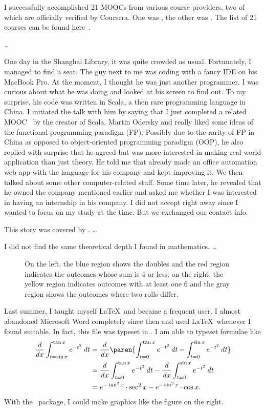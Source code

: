 	I successfully accomplished 21 MOOCs from various course providers, two of which are officially verified by Coursera. One was , the other was . The list of 21 courses can be found here~\cite{accredible}.
	
	\dots
	
	One day in the Shanghai Library, it was quite crowded as usual. Fortunately, I managed to find a seat. The guy next to me was coding with a fancy IDE on his MacBook Pro. At the moment, I thought he was just another programmer. I was curious about what he was doing and looked at his screen to find out. To my surprise, his code was written in Scala, a then rare programming language in China. I initiated the talk with him by saying that I just completed a related MOOC~\cite{FPPS} by the creator of Scala, Martin Odersky and really liked some ideas of the functional programming paradigm (FP). Possibly due to the rarity of FP in China as opposed to object-oriented programming paradigm (OOP), he also replied with surprise that he agreed but was more interested in making real-world application than just theory. He told me that already made an office automation web app with the language for his company and kept improving it. We then talked about some other computer-related stuff. Some time later, he revealed that he owned the company mentioned earlier and asked me whether I was interested in having an internship in his company. I did not accept right away since I wanted to focus on my study at the time. But we exchanged our contact info.
	
	This story was covered by . \dots %
	
	I did not find the same theoretical depth I found in mathematics.
	\dots
	
	\begin{wrapfigure}[8]{r}[.6in]{.4\textwidth}
		\scalebox{.4}{  }
		\caption{On the left, the blue region shows the doubles and the red region indicates the outcomes whose sum is 4 or less; on the right, the yellow region indicates outcomes with at least one 6 and the gray region shows the outcomes where two rolls differ.}
		\label{fig:CondProbEx}
	\end{wrapfigure}
	
	Last summer, I taught myself \LaTeX\ and became a frequent user. I almost abandoned Microsoft Word completely since then and used \LaTeX\ whenever I found suitable. In fact, this file was typeset in \XeLaTeX. I am able to typeset formulae like
	\begin{align*}
	\dd x \int_{t=\sin x}^{\tan x} e^{-t^2} \dt
		&= \dd x \paren{\int_{t=0}^{\tan x} e^{-t^2} \dt -
			\int_{t=0}^{\sin x} e^{-t^2} \dt} \\
		&= \dd x \int_{t=0}^{\tan x} e^{-t^2} \dt
			- \dd x \int_{t=0}^{\sin x} e^{-t^2} \dt \\
		&= e^{-\tan^2 x} \cdot \sec^2 x - e^{-\sin^2 x} \cdot \cos x.
	\end{align*}
	With the \TikZ\ package, I could make graphics like the figure on the right.
	
